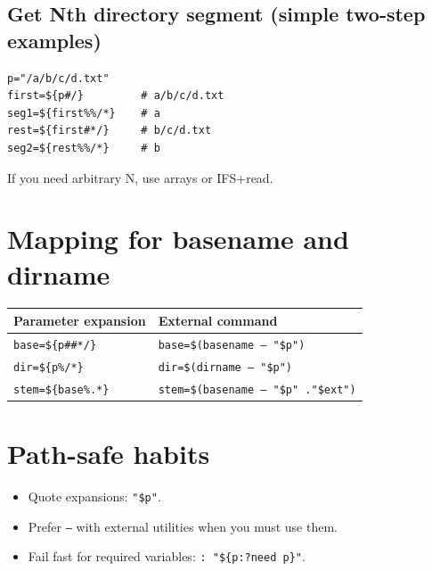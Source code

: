 \documentclass[11pt]{article}
\begin{document}
\subsection{Get Nth directory segment (simple two-step examples)}
\begin{lstlisting}
p="/a/b/c/d.txt"
first=${p#/}         # a/b/c/d.txt
seg1=${first%%/*}    # a
rest=${first#*/}     # b/c/d.txt
seg2=${rest%%/*}     # b
\end{lstlisting}

If you need arbitrary N, use arrays or IFS+read.

\section{Mapping for basename and dirname}
\begin{longtable}{p{}p{}}
\toprule
Parameter expansion & External command \\
\midrule
\texttt{base=\$\{p\#\#*/\}} & \texttt{base=\$(basename -- "\$p")} \\
\texttt{dir=\$\{p\%/*\}} & \texttt{dir=\$(dirname -- "\$p")} \\
\texttt{stem=\$\{base\%.*\}} & \texttt{stem=\$(basename -- "\$p" ."\$ext")} \\
\bottomrule
\end{longtable}

\section{Path-safe habits}
\begin{itemize}
\item Quote expansions: \texttt{"\$p"}.
\item Prefer \texttt{--} with external utilities when you must use them.
\item Fail fast for required variables: \texttt{: "\$\{p:?need p\}"}.
\end{itemize}
\end{document}
